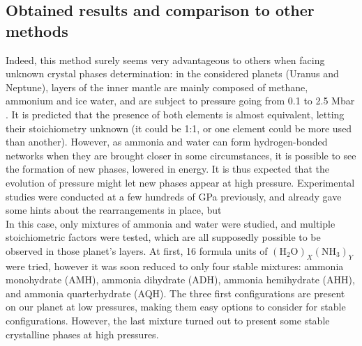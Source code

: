 \documentclass[11pt]{article}
\begin{document}
\begin{multicols}{2}
\section*{Obtained results and comparison to other methods}
Indeed, this method surely seems very advantageous to others when facing unknown crystal phases determination: in the considered planets (Uranus and Neptune), layers of the inner mantle are mainly composed of methane, ammonium and ice water, and are subject to pressure going from 0.1 to 2.5 Mbar \cite{https://doi.org/10.1029/JB085iB01p00225}. It is predicted that the presence of both elements is almost equivalent, letting their stoichiometry unknown (it could be 1:1, or one element could be more used than another). However, as ammonia and water can form hydrogen-bonded networks when they are brought closer in some circumstances, it is possible to see the formation of new phases, lowered in energy. It is thus expected that the evolution of pressure might let new phases appear at high pressure. Experimental studies were conducted at a few hundreds of GPa previously, and already gave some hints about the rearrangements in place, but \\
In this case, only mixtures of ammonia and water were studied, and multiple stoichiometric factors were tested, which are all supposedly possible to be observed in those planet's layers. At first, 16 formula units of $( \mathrm{H}_2\mathrm{O})_{X}(\mathrm{N}\mathrm{H}_3)_{Y}$ were tried, however it was soon reduced to only four stable mixtures: ammonia monohydrate (AMH), ammonia dihydrate (ADH), ammonia hemihydrate (AHH), and ammonia quarterhydrate (AQH). The three first configurations are present on our planet at low pressures, making them easy options to consider for stable configurations. However, the last mixture turned out to present some stable crystalline phases at high pressures.\vspace{1em}


\end{multicols}
\end{document}
